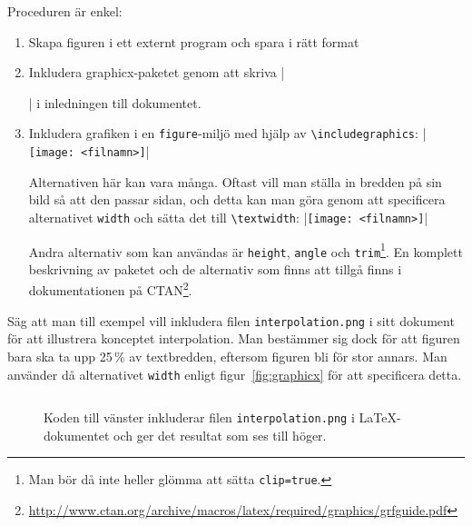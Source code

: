 \documentclass[swe,12pt]{skrapport}
\newcommand\cli[1]{\texttt{#1}}							%
\newcommand\pack[1]{\textsf{#1}}						%
\newcommand\cmd[1]{\texttt{\textbackslash{}#1}}			%
\newcommand\env[1]{\texttt{#1}}							%
\begin{document}
	Proceduren är enkel:
	\begin{enumerate}
		\item Skapa figuren i ett externt program och spara i rätt format
		
		\item Inkludera \pack{graphicx}-paketet genom att skriva
		|\usepackage{graphicx}|
		i inledningen till dokumentet.
		
		\item Inkludera grafiken i en \env{figure}-miljö med hjälp av
		\cmd{includegraphics}:
		|\texttt{[image: <filnamn>]}|
		
		Alternativen här kan vara många. Oftast vill man ställa in bredden på
		sin bild så att den passar sidan, och detta kan man göra genom att
		specificera alternativet \cli{width} och sätta det till
		\cmd{textwidth}:
		|\texttt{[image: <filnamn>]}|
		
		Andra alternativ som kan användas är \cli{height}, \cli{angle}
		och \cli{trim}\footnote{Man bör då inte heller glömma att sätta
		\cli{clip=true}.\hfil}. En komplett beskrivning av paketet och de 
		alternativ som finns att tillgå finns i dokumentationen på
		CTAN\footnote{\url{http://www.ctan.org/archive/macros/latex/required/graphics/grfguide.pdf}}.
	\end{enumerate}
	
	Säg att man till exempel vill inkludera filen \cli{interpolation.png}
	i sitt dokument för att illustrera konceptet interpolation. Man bestämmer
	sig dock för att figuren bara ska ta upp 25\,\% av textbredden, eftersom
	figuren bli för stor annars. Man använder då alternativet \cli{width}
	enligt figur~\vref{fig:graphicx} för att specificera detta.
	
	\begin{figure}[p]
		\begin{minipage}{0.475\textwidth} %
				\vfil\inputminted[frame=single,firstline=10,lastline=17,gobble=2]{latex}{ex/4/graphicx.tex}\vfil
		\end{minipage}
		\hfil
		\begin{minipage}{0.475\textwidth} %
		\end{minipage}
		\caption{Koden till vänster inkluderar filen \cli{interpolation.png} i
		\LaTeX-dokumentet och ger det resultat som ses till höger.}
		\label{fig:graphicx}
	\end{figure}
	
\end{document}
